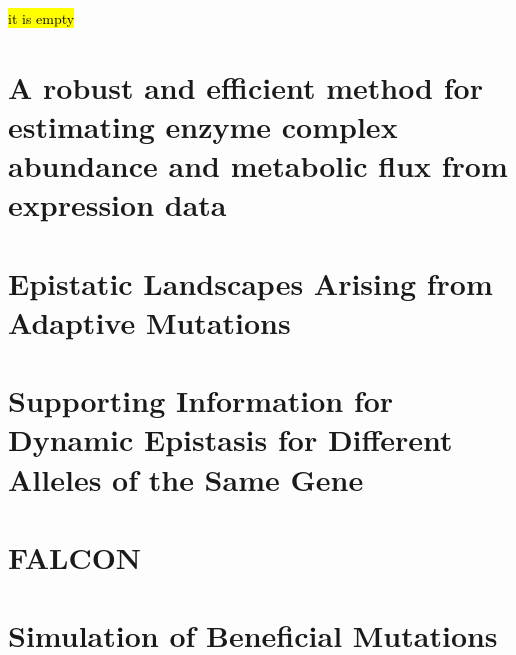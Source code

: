 \documentclass[phd,tocprelim]{cornell}
\newcommand*{\commonDir}{../common/}   %
\begin{document}
\hl{it is empty}


\chapter{A robust and efficient method for
estimating enzyme complex abundance
and metabolic flux from expression data}

\falconAbstractMotivation \falconAbstractResults



\chapter{Epistatic Landscapes Arising from Adaptive Mutations}
\epiBeneMutAbstract


\appendix

\chapter{Supporting Information for
Dynamic Epistasis for Different Alleles of the Same Gene}


\chapter{FALCON}



\chapter{Simulation of Beneficial Mutations}



\end{document}
